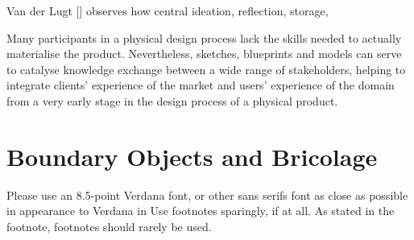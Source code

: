 \documentclass{chi-ext}
\begin{document}

Van der Lugt [] observes how central ideation, reflection, storage, 

Many participants in a physical design process lack the skills needed to actually materialise the product. Nevertheless, sketches, blueprints and models can serve to catalyse knowledge exchange between a wide range of stakeholders, helping to integrate clients' experience of the market and users' experience of the domain from a very early stage in the design process of a physical product.

\section{Boundary Objects and Bricolage}
Please use an 8.5-point Verdana font, or other sans serifs font as close as possible in appearance to Verdana in {Use footnotes sparingly, if at all.}
As stated in the footnote, footnotes should rarely be used.
\end{document}
